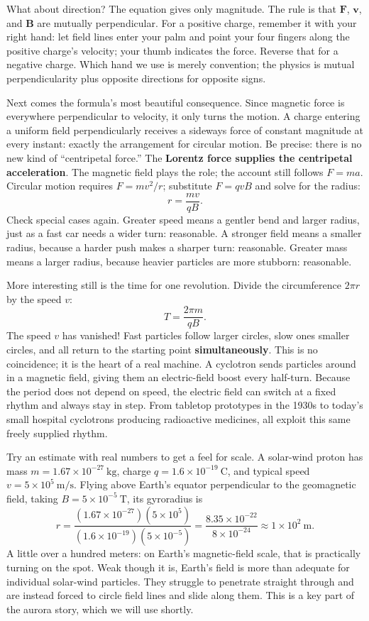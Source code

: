 \begin{mainline}
What about direction? The equation gives only magnitude. The rule is that \(\bm F\), \(\bm v\), and \(\bm B\) are mutually perpendicular. For a positive charge, remember it with your right hand: let field lines enter your palm and point your four fingers along the positive charge's velocity; your thumb indicates the force. Reverse that for a negative charge. Which hand we use is merely convention; the physics is mutual perpendicularity plus opposite directions for opposite signs.

Next comes the formula's most beautiful consequence. Since magnetic force is everywhere perpendicular to velocity, it only turns the motion. A charge entering a uniform field perpendicularly receives a sideways force of constant magnitude at every instant: exactly the arrangement for circular motion. Be precise: there is no new kind of ``centripetal force.'' The \textbf{Lorentz force supplies the centripetal acceleration}. The magnetic field plays the role; the account still follows \(F=ma\). Circular motion requires \(F=mv^2/r\); substitute \(F=qvB\) and solve for the radius:
\[
r=\frac{mv}{qB}.
\]
Check special cases again. Greater speed means a gentler bend and larger radius, just as a fast car needs a wider turn: reasonable. A stronger field means a smaller radius, because a harder push makes a sharper turn: reasonable. Greater mass means a larger radius, because heavier particles are more stubborn: reasonable.

More interesting still is the time for one revolution. Divide the circumference \(2\pi r\) by the speed \(v\):
\[
T=\frac{2\pi m}{qB}.
\]
The speed \(v\) has vanished! Fast particles follow larger circles, slow ones smaller circles, and all return to the starting point \textbf{simultaneously}. This is no coincidence; it is the heart of a real machine. A cyclotron sends particles around in a magnetic field, giving them an electric-field boost every half-turn. Because the period does not depend on speed, the electric field can switch at a fixed rhythm and always stay in step. From tabletop prototypes in the 1930s to today's small hospital cyclotrons producing radioactive medicines, all exploit this same freely supplied rhythm.

Try an estimate with real numbers to get a feel for scale. A solar-wind proton has mass \(m=1.67\times10^{-27}\ \mathrm{kg}\), charge \(q=1.6\times10^{-19}\ \mathrm C\), and typical speed \(v=5\times10^{5}\ \mathrm{m/s}\). Flying above Earth's equator perpendicular to the geomagnetic field, taking \(B=5\times10^{-5}\ \mathrm T\), its gyroradius is
\[
r=\frac{(1.67\times10^{-27})(5\times10^{5})}{(1.6\times10^{-19})(5\times10^{-5})}
=\frac{8.35\times10^{-22}}{8\times10^{-24}}\approx 1\times10^{2}\ \mathrm m.
\]
A little over a hundred meters: on Earth's magnetic-field scale, that is practically turning on the spot. Weak though it is, Earth's field is more than adequate for individual solar-wind particles. They struggle to penetrate straight through and are instead forced to circle field lines and slide along them. This is a key part of the aurora story, which we will use shortly.


\end{mainline}
